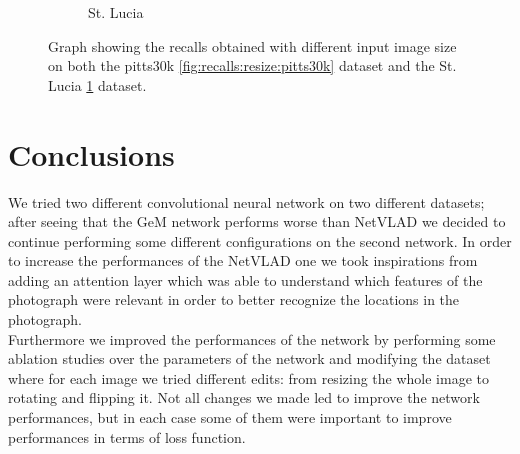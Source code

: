 \documentclass[10pt,twocolumn,letterpaper]{article}
\begin{document}
\begin{figure}[!h]
\begin{subfigure}[b]{0.23\textwidth}
		\caption{St. Lucia}
		\label{fig:recalls:resize:st_lucia}
	\end{subfigure}
	\caption{Graph showing the recalls obtained with different input image size on both the pitts30k \ref{fig:recalls:resize:pitts30k} dataset and the St. Lucia \ref{fig:recalls:resize:st_lucia} dataset.}
	\label{fig:recalls:resize}
\end{figure}

\section{Conclusions}
We tried  two different convolutional neural network on two different datasets; after seeing that the GeM network performs worse than NetVLAD
we decided to continue performing some different configurations on the second network. In order to increase the performances of the NetVLAD one
we took inspirations from \cite{CRN} adding an attention layer which was able to understand which features of the photograph were relevant in order
to better recognize the locations in the photograph.\\
Furthermore we improved the performances of the network by performing some ablation studies over the parameters of the network and modifying 
the dataset where for each image we tried different edits: from resizing the whole image to rotating and flipping it. Not all changes we made
led to improve the network performances, but in each case some of them were  important to improve performances in terms of 
loss function.
{\small
	
	
}
	
\end{document}
